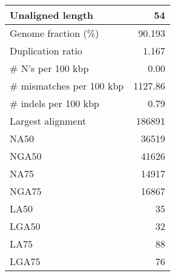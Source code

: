 \documentclass[12pt,a4paper]{article}
\begin{document}
\begin{table}[ht]
\begin{center}
\begin{tabular}{|l*{1}{|r}|}
Unaligned length & 54 \\ \hline
Genome fraction (\%) & 90.193 \\ \hline
Duplication ratio & 1.167 \\ \hline
\# N's per 100 kbp & 0.00 \\ \hline
\# mismatches per 100 kbp & 1127.86 \\ \hline
\# indels per 100 kbp & 0.79 \\ \hline
Largest alignment & 186891 \\ \hline
NA50 & 36519 \\ \hline
NGA50 & 41626 \\ \hline
NA75 & 14917 \\ \hline
NGA75 & 16867 \\ \hline
LA50 & 35 \\ \hline
LGA50 & 32 \\ \hline
LA75 & 88 \\ \hline
LGA75 & 76 \\ \hline
\end{tabular}
\end{center}
\end{table}
\end{document}
